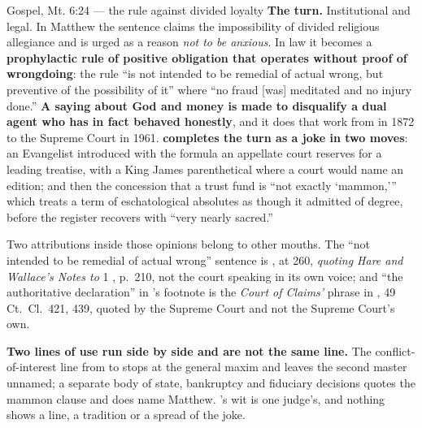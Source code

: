 \begin{afterlife}{Gospel, Mt. 6:24 --- the rule against divided loyalty}
\textbf{The turn.} Institutional and legal. In Matthew the sentence claims the
impossibility of divided religious allegiance and is urged as a reason \emph{not
to be anxious}. In law it becomes a \textbf{prophylactic rule of positive
obligation that operates without proof of wrongdoing}: the rule ``is not
intended to be remedial of actual wrong, but preventive of the possibility of
it'' where ``no fraud [was] meditated and no injury done.'' \textbf{A saying
about God and money is made to disqualify a dual agent who has in fact behaved
honestly}, and it does that work from  in 1872 to the Supreme
Court in 1961. \textbf{ completes the turn as a joke in two
moves}: an Evangelist introduced with the formula an appellate court reserves
for a leading treatise, with a King James parenthetical where a court would name
an edition; and then the concession that a trust fund is ``not exactly
`mammon,''' which treats a term of eschatological absolutes as though it
admitted of degree, before the register recovers with ``very nearly sacred.''

Two attributions inside those opinions belong to other mouths. The ``not
intended to be remedial of actual wrong'' sentence is , at 260,
\emph{quoting Hare and Wallace's Notes to} 1 ,
p.~210, not the court speaking in its own voice; and ``the authoritative
declaration'' in 's footnote is the \emph{Court of
Claims'} phrase in , 49 Ct.\ Cl.\
421, 439, quoted by the Supreme Court and not the Supreme Court's own.

\textbf{Two lines of use run side by side and are not the same line.} The
conflict-of-interest line from \work{Everhart} to 
stops at the general maxim and leaves the second master unnamed; a separate body
of state, bankruptcy and fiduciary decisions quotes the mammon clause and does
name Matthew. \work{Chapman}'s wit is one judge's, and nothing shows a
line, a tradition or a spread of the joke.
\end{afterlife}

